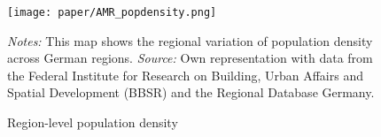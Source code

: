 \documentclass[11pt, a4paper,draft]{article} %
\begin{document}
\newpage

\vspace*{\fill}
\begin{figure}[H]\centering
	\caption{Region-level population density}\label{fig: AMR_regions_population_density}
	\texttt{[image: paper/AMR\_popdensity.png]}
	\scriptsize
	\begin{minipage}{0.9\linewidth}
		\emph{Notes:} This map shows the regional variation of population density across German regions. \emph{Source:} Own representation with data from the Federal Institute for Research on Building, Urban Affairs and Spatial Development (BBSR) and the Regional Database Germany.
	\end{minipage}
\end{figure}
\vspace*{\fill}\clearpage


\end{document}
